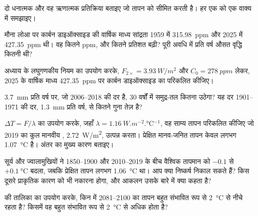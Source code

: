 \begin{exercise}[$\star$]\label{exo:g12:climate-change:5}
दो धनात्मक  और वह ऋणात्मक प्रतिक्रिया बताइए जो
तापन को सीमित करती है। हर एक को एक वाक्य में समझाइए।
\end{exercise}

\begin{exercise}[$\star\star$]\label{exo:g12:climate-change:6}
मौना लोआ पर कार्बन डाइऑक्साइड की वार्षिक माध्य सांद्रता 1959 में
\qty{315.98}{ppm} और 2025 में \qty{427.35}{ppm} थी। वह कितने ppm,
और कितने प्रतिशत बढ़ी? पूरी अवधि में प्रति वर्ष औसत वृद्धि
कितनी थी?
\end{exercise}

\begin{exercise}[$\star\star$]\label{exo:g12:climate-change:7}
अध्याय के लघुगणकीय नियम का उपयोग करके, $F_{2\times} =
\qty{3.93}{W/m^2}$ और $C_0 = \qty{278}{ppm}$ लेकर, 2025 के वार्षिक माध्य
\qty{427.35}{ppm} पर कार्बन डाइऑक्साइड का  परिकलित कीजिए।
\end{exercise}

\begin{exercise}[$\star\star$]\label{exo:g12:climate-change:8}
\qty{3.7}{mm} प्रति वर्ष पर, जो 2006--2018 की दर है, 30 वर्षों में समुद्र-तल कितना
उठेगा? यह दर 1901--1971 की दर, \qty{1.3}{mm} प्रति वर्ष, से कितने गुना
तेज़ है?
\end{exercise}

\begin{exercise}[$\star\star$]\label{exo:g12:climate-change:9}
$\Delta T = F/\lambda$ का उपयोग करके, जहाँ $\lambda = \qty{1.16}{W.m^{-2}.\degreeCelsius^{-1}}$,
वह साम्य तापन परिकलित कीजिए जो 2019 का कुल मानवीय ,
\qty{2.72}{W/m^2}, उत्पन्न करता। प्रेक्षित मानव-जनित तापन केवल
लगभग \qty{1.07}{\degreeCelsius} है। अंतर का मुख्य कारण बताइए।
\end{exercise}

\begin{exercise}[$\star\star$]\label{exo:g12:climate-change:10}
सूर्य और ज्वालामुखियों ने 1850--1900 और 2010--2019 के बीच वैश्विक तापमान को
$-0.1$ से $+\qty{0.1}{\degreeCelsius}$ बदला, जबकि प्रेक्षित
तापन लगभग \qty{1.06}{\degreeCelsius} था। आप क्या निष्कर्ष निकाल सकते हैं? किस
दूसरे प्राकृतिक कारण को भी नकारना होगा, और आकलन उसके बारे में
क्या कहता है?
\end{exercise}

\begin{exercise}[$\star\star$]\label{exo:g12:climate-change:11}
 की तालिका का उपयोग करके, किन  में 2081--2100 का तापन
बहुत संभावित रूप से \qty{2}{\degreeCelsius} से नीचे रहता है? किसमें वह
बहुत संभावित रूप से \qty{2}{\degreeCelsius} से अधिक होता है?
\end{exercise}

